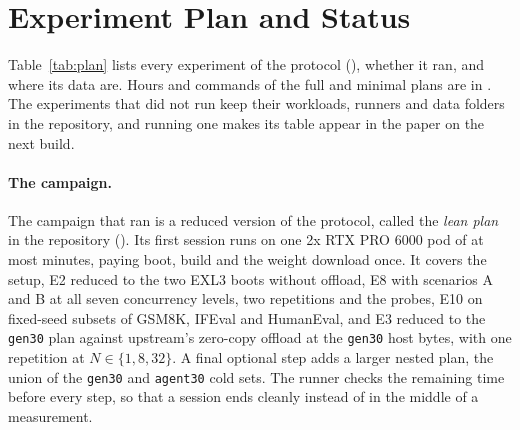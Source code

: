 \section{Experiment Plan and Status}\label{app:plan}

Table~\ref{tab:plan} lists every experiment of the protocol (), whether it ran,
and where its data are. Hours and commands of the full and minimal plans are in . The
experiments that did not run keep their workloads, runners and data folders in the repository, and running one makes
its table appear in the paper on the next build.

\paragraph{The campaign.}
The campaign that ran is a reduced version of the protocol, called the \emph{lean plan} in the repository
(). Its first session runs on one 2x RTX PRO 6000 pod of at most
 minutes, paying boot, build and the weight download once. It covers the setup, E2 reduced to
the two EXL3 boots without offload, E8 with scenarios A and B at all seven concurrency levels, two repetitions and the
probes, E10 on fixed-seed subsets of GSM8K, IFEval and HumanEval, and E3 reduced to the \texttt{gen30} plan against
upstream's zero-copy offload at the \texttt{gen30} host bytes, with one repetition at $N\in\{1,8,32\}$. A final
optional step adds a larger nested plan, the union of the \texttt{gen30} and \texttt{agent30} cold sets. The runner
checks the remaining time before every step, so that a session ends cleanly instead of in the middle of a
measurement.

